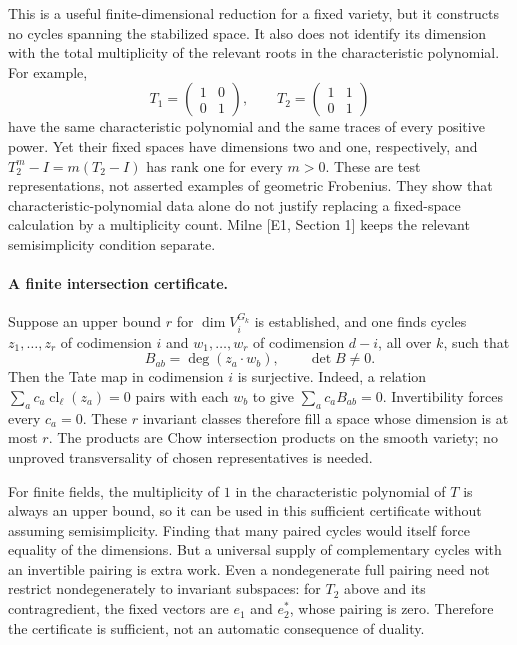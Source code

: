 \documentclass[11pt]{article}
\begin{document}
This is a useful finite-dimensional reduction for a fixed variety, but
 it constructs no cycles spanning the stabilized space. It also does not
 identify its dimension with the total multiplicity of the relevant
 roots in the characteristic polynomial. For example,
\[
 T_1=\begin{pmatrix}1&0\\0&1\end{pmatrix},\qquad
 T_2=\begin{pmatrix}1&1\\0&1\end{pmatrix}
\]
 have the same characteristic polynomial and the same traces of every
 positive power. Yet their fixed spaces have dimensions two and one,
 respectively, and $T_2^m-I=m(T_2-I)$ has rank one for every $m>0$.
 These are test representations, not asserted examples of geometric
 Frobenius. They show that characteristic-polynomial data alone do not
 justify replacing a fixed-space calculation by a multiplicity count.
 Milne [E1, Section 1] keeps the relevant semisimplicity condition separate.

\paragraph{A finite intersection certificate.}
Suppose an upper bound $r$ for $\dim V_i^{G_k}$ is established, and one
 finds cycles $z_1,\ldots,z_r$ of codimension $i$ and
 $w_1,\ldots,w_r$ of codimension $d-i$, all over $k$, such that
\begin{equation}\label{tc:matrix}
 B_{ab}=\deg(z_a\cdot w_b),\qquad \det B\ne0.
\end{equation}
Then the Tate map in codimension $i$ is surjective. Indeed, a relation
 $\sum_a c_a\operatorname{cl}_\ell(z_a)=0$ pairs with each $w_b$ to give
 $\sum_a c_aB_{ab}=0$. Invertibility forces every $c_a=0$. These $r$
 invariant classes therefore fill a space whose dimension is at most $r$.
 The products are Chow intersection products on the smooth variety; no
 unproved transversality of chosen representatives is needed.

For finite fields, the multiplicity of $1$ in the characteristic polynomial
 of $T$ is always an upper bound, so it can be used in this sufficient
 certificate without assuming semisimplicity. Finding that many paired
 cycles would itself force equality of the dimensions. But a universal
 supply of complementary cycles with an invertible pairing is extra work.
 Even a nondegenerate full pairing need not restrict nondegenerately to
 invariant subspaces: for $T_2$ above and its contragredient, the fixed
 vectors are $e_1$ and $e_2^*$, whose pairing is zero. Therefore the
 certificate is sufficient, not an automatic consequence of duality.
\end{document}

